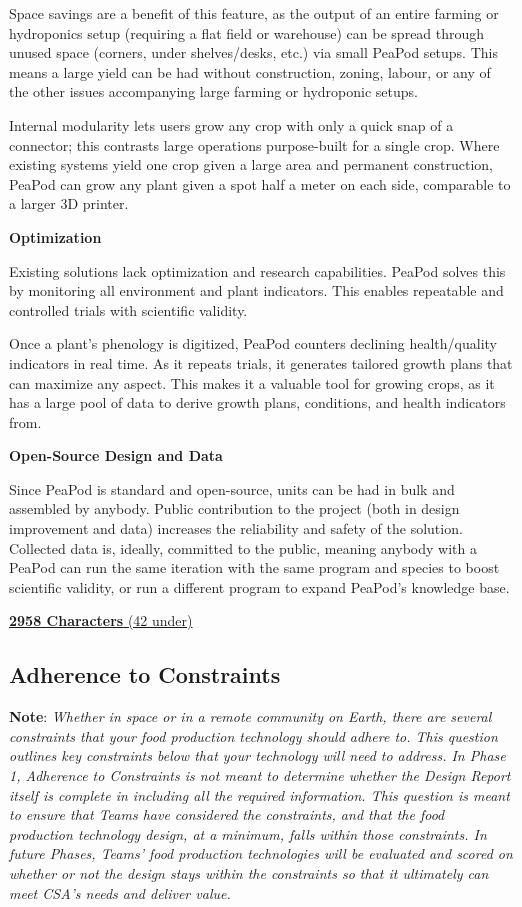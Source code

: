 \documentclass{report}
\begin{document}
Space savings are a benefit of this feature, as the output of an entire farming or hydroponics setup (requiring a flat field or warehouse) can be spread through unused space (corners, under shelves/desks, etc.) via small PeaPod setups. This means a large yield can be had without construction, zoning, labour, or any of the other issues accompanying large farming or hydroponic setups.

Internal modularity lets users grow any crop with only a quick snap of a connector; this contrasts large operations purpose-built for a single crop. Where existing systems yield one crop given a large area and permanent construction, PeaPod can grow any plant given a spot half a meter on each side, comparable to a larger 3D printer.

\textbf{Optimization}

Existing solutions lack optimization and research capabilities. PeaPod solves this by monitoring all environment and plant indicators. This enables repeatable and controlled trials with scientific validity.

Once a plant's phenology is digitized, PeaPod counters declining health/quality indicators in real time. As it repeats trials, it generates tailored growth plans that can maximize any aspect. This makes it a valuable tool for growing crops, as it has a large pool of data to derive growth plans, conditions, and health indicators from.

\textbf{Open-Source Design and Data}

Since PeaPod is standard and open-source, units can be had in bulk and assembled by anybody. Public contribution to the project (both in design improvement and data) increases the reliability and safety of the solution. Collected data is, ideally, committed to the public, meaning anybody with a PeaPod can run the same iteration with the same program and species to boost scientific validity, or run a different program to expand PeaPod's knowledge base.

\uline{\textbf{2958 Characters} (42 under)}

\vspace{0.5cm}

\subsection{Adherence to Constraints}
\label{sec:constraints}

\textbf{Note}: \textit{Whether in space or in a remote community on Earth, there are several constraints that your food production technology should adhere to. This question outlines key constraints below that your technology will need to address. In Phase 1, Adherence to Constraints is not meant to determine whether the Design Report itself is complete in including all the required information. This question is meant to ensure that Teams have considered the constraints, and that the food production technology design, at a minimum, falls within those constraints. In future Phases, Teams’ food production technologies will be evaluated and scored on whether or not the design stays within the constraints so that it ultimately can meet CSA’s needs and deliver value.}
\end{document}
